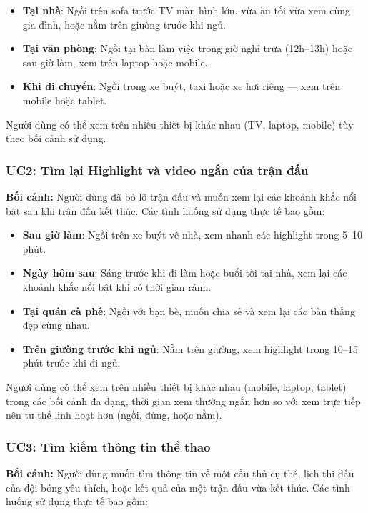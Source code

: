 \begin{itemize}
    \item \textbf{Tại nhà}: Ngồi trên sofa trước TV màn hình lớn, vừa ăn tối vừa xem cùng gia đình, hoặc nằm trên giường trước khi ngủ.
    \item \textbf{Tại văn phòng}: Ngồi tại bàn làm việc trong giờ nghỉ trưa (12h--13h) hoặc sau giờ làm, xem trên laptop hoặc mobile.
    \item \textbf{Khi di chuyển}: Ngồi trong xe buýt, taxi hoặc xe hơi riêng --- xem trên mobile hoặc tablet.
\end{itemize}

Người dùng có thể xem trên nhiều thiết bị khác nhau (TV, laptop, mobile) tùy theo bối cảnh sử dụng.

\subsubsection{UC2: Tìm lại Highlight và video ngắn của trận đấu}

\textbf{Bối cảnh:} Người dùng đã bỏ lỡ trận đấu và muốn xem lại các khoảnh khắc nổi bật sau khi trận đấu kết thúc. Các tình huống sử dụng thực tế bao gồm:

\begin{itemize}
    \item \textbf{Sau giờ làm}: Ngồi trên xe buýt về nhà, xem nhanh các highlight trong 5--10 phút.
    \item \textbf{Ngày hôm sau}: Sáng trước khi đi làm hoặc buổi tối tại nhà, xem lại các khoảnh khắc nổi bật khi có thời gian rảnh.
    \item \textbf{Tại quán cà phê}: Ngồi với bạn bè, muốn chia sẻ và xem lại các bàn thắng đẹp cùng nhau.
    \item \textbf{Trên giường trước khi ngủ}: Nằm trên giường, xem highlight trong 10--15 phút trước khi đi ngủ.
\end{itemize}

Người dùng có thể xem trên nhiều thiết bị khác nhau (mobile, laptop, tablet) trong các bối cảnh đa dạng, thời gian xem thường ngắn hơn so với xem trực tiếp nên tư thế linh hoạt hơn (ngồi, đứng, hoặc nằm).

\subsubsection{UC3: Tìm kiếm thông tin thể thao}

\textbf{Bối cảnh:} Người dùng muốn tìm thông tin về một cầu thủ cụ thể, lịch thi đấu của đội bóng yêu thích, hoặc kết quả của một trận đấu vừa kết thúc. Các tình huống sử dụng thực tế bao gồm:


